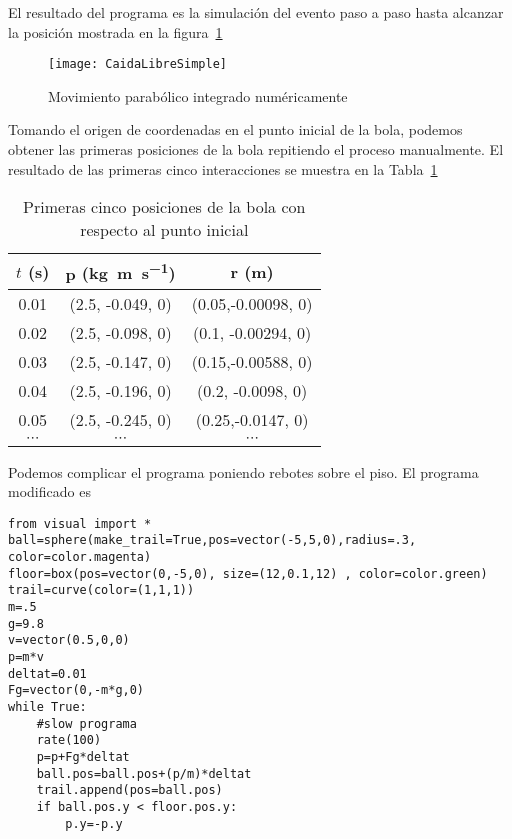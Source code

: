 El resultado del programa es la simulación del evento paso a paso hasta alcanzar la posición mostrada en la figura~\ref{fig:CaidaLibreSimple}

\begin{frame}[plain]
  \begin{figure}
    \centering
    \texttt{[image: CaidaLibreSimple]}
    \caption{Movimiento parabólico integrado numéricamente}
    \label{fig:CaidaLibreSimple}
  \end{figure}
\end{frame}
Tomando el origen de coordenadas en el punto inicial de la bola, podemos obtener las primeras posiciones de la bola repitiendo el proceso manualmente. El resultado de las primeras cinco interacciones se muestra en la Tabla~\ref{tab:caidalibre}
\begin{table}
  \centering
  \begin{tabular}{|c|c|c|}\hline
    $t$ (\si{\second}) & $\mathbf{p}$ (\si{\kilo\gram \meter\per\second}) & $\mathbf{r}$ (\si{\meter})\\\hline
    0.01 & (2.5, -0.049, 0) & (0.05,-0.00098, 0)\\
    0.02 & (2.5, -0.098, 0) & (0.1, -0.00294, 0)\\
    0.03 & (2.5, -0.147, 0) & (0.15,-0.00588, 0)\\
    0.04 & (2.5, -0.196, 0) & (0.2, -0.0098,  0)\\
    0.05 & (2.5, -0.245, 0) & (0.25,-0.0147,  0)\\ 
    $\cdots$ & $\cdots$ & $\cdots$ \\ \hline
  \end{tabular}
  \caption{Primeras cinco posiciones de la bola con respecto al punto inicial}
  \label{tab:caidalibre}
\end{table}



Podemos complicar el programa poniendo rebotes sobre el piso. El programa modificado es
\begin{frame}
\begin{lstlisting}
from visual import *
ball=sphere(make_trail=True,pos=vector(-5,5,0),radius=.3, color=color.magenta)
floor=box(pos=vector(0,-5,0), size=(12,0.1,12) , color=color.green)
trail=curve(color=(1,1,1))
m=.5
g=9.8
v=vector(0.5,0,0)
p=m*v
deltat=0.01
Fg=vector(0,-m*g,0)
while True:
    #slow programa
    rate(100)
    p=p+Fg*deltat
    ball.pos=ball.pos+(p/m)*deltat
    trail.append(pos=ball.pos)
    if ball.pos.y < floor.pos.y:
        p.y=-p.y

\end{lstlisting}
\end{frame}

